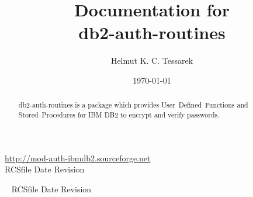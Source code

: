\documentclass[11pt,letterpaper]{article}
\date{\today}
\author{Helmut K. C. Tessarek}
\title{Documentation for\\
db2-auth-routines}
\begin{document}
\maketitle
\setcounter{page}{0}
\thispagestyle{empty}
\begin{abstract}
db2-auth-routines is a package which provides \mbox{User Defined Functions} and \mbox{Stored Procedures} for IBM\textsuperscript{\textregistered}{} DB2\textsuperscript{\textregistered}{} to encrypt and verify \mbox{passwords}.
\end{abstract}

\vfill

\begin{center}
\href{http://mod-auth-ibmdb2.sourceforge.net}{http://mod-auth-ibmdb2.sourceforge.net}\\

{\tiny \rm $ $RCSfile$ $ }
{\tiny \rm $ $Date$ $ }
{\tiny \rm $ $Revision$ $ }

\end{center}
\newpage
\renewcommand{\thepage}{\roman{page}}
\tableofcontents
\newpage
\pagestyle{fancy}
\lhead{}
\rhead{}
\cfoot{\thepage\ / \pageref*{LastPage}}
\renewcommand{\headrulewidth}{0.4pt}
\renewcommand{\footrulewidth}{0.4pt}
\renewcommand{\thepage}{\arabic{page}}
\setcounter{page}{1}


\newpage

\begin{appendix}



\end{appendix}

\begin{center}
\vspace{\fill}\ \newline
{\tiny \rm $ $RCSfile$ $ }
{\tiny \rm $ $Date$ $ }
{\tiny \rm $ $Revision$ $ }
\end{center}
\end{document}
